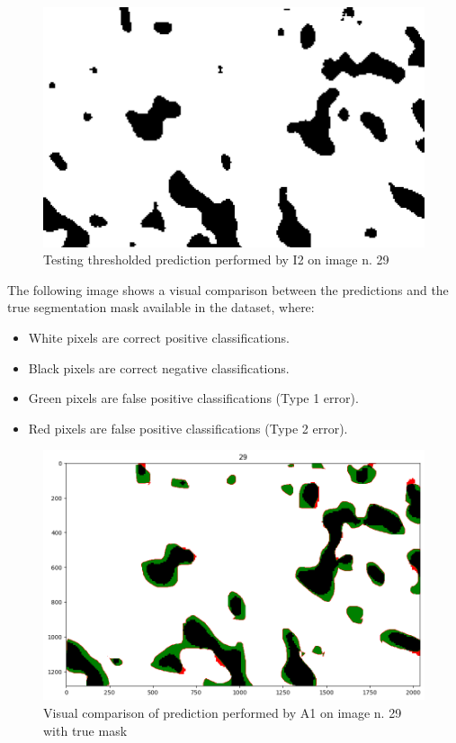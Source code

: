 \begin{figure}[H]
 \centering
 \includegraphics[scale=0.2, cframe=bluepoli 2pt]{./resources/I2_pred_image_29.png}
 \caption[I2 thresholded test prediction]
    {Testing thresholded  prediction performed by I2 on image n. 29}
\end{figure}

The following image shows a visual comparison between the predictions and the true segmentation mask available in the dataset, where:

\begin{itemize}
    \item White pixels are correct positive classifications.
    \item Black pixels are correct negative classifications.
    \item Green pixels are false positive classifications (Type 1 error).
    \item Red pixels are false positive classifications (Type 2 error).
\end{itemize}

\begin{figure}[H]
 \centering
 \includegraphics[scale=0.6]{./resources/A1_comp_29.png}
 \caption[A1 test prediction comparison]
    {Visual comparison of prediction performed by A1 on image n. 29 with true mask}
\end{figure}

